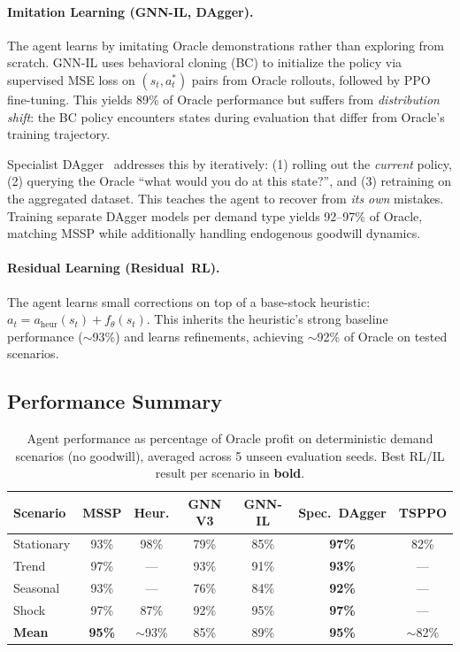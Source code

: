 \paragraph{Imitation Learning (GNN-IL, DAgger).}
The agent learns by imitating Oracle demonstrations rather than exploring from scratch. GNN-IL uses behavioral cloning (BC) to initialize the policy via supervised MSE loss on $(s_t, a^*_t)$ pairs from Oracle rollouts, followed by PPO fine-tuning. This yields 89\% of Oracle performance but suffers from \emph{distribution shift}: the BC policy encounters states during evaluation that differ from Oracle's training trajectory.

Specialist DAgger~\cite{ross2011dagger} addresses this by iteratively: (1) rolling out the \emph{current} policy, (2) querying the Oracle ``what would you do at this state?'', and (3) retraining on the aggregated dataset. This teaches the agent to recover from \emph{its own} mistakes. Training separate DAgger models per demand type yields 92--97\% of Oracle, matching MSSP while additionally handling endogenous goodwill dynamics.

\paragraph{Residual Learning (Residual~RL).}
The agent learns small corrections on top of a base-stock heuristic: $a_t = a_{\text{heur}}(s_t) + f_\theta(s_t)$. This inherits the heuristic's strong baseline performance ($\sim$93\%) and learns refinements, achieving $\sim$92\% of Oracle on tested scenarios.

\subsection{Performance Summary}

\begin{table}[h!]
\caption{Agent performance as percentage of Oracle profit on deterministic demand scenarios (no goodwill), averaged across 5 unseen evaluation seeds. Best RL/IL result per scenario in \textbf{bold}.}
\label{tab:performance}
\centering
\small
\begin{tabular}{lcccccc}
\toprule
\textbf{Scenario} & \textbf{MSSP} & \textbf{Heur.} & \textbf{GNN V3} & \textbf{GNN-IL} & \textbf{Spec.\ DAgger} & \textbf{TSPPO} \\
\midrule
Stationary & 93\% & 98\% & 79\% & 85\% & \textbf{97\%} & 82\% \\
Trend & 97\% & --- & 93\% & 91\% & \textbf{93\%} & --- \\
Seasonal & 93\% & --- & 76\% & 84\% & \textbf{92\%} & --- \\
Shock & 97\% & 87\% & 92\% & 95\% & \textbf{97\%} & --- \\
\midrule
\textbf{Mean} & \textbf{95\%} & $\sim$93\% & 85\% & 89\% & \textbf{95\%} & $\sim$82\% \\
\bottomrule
\end{tabular}
\end{table}

